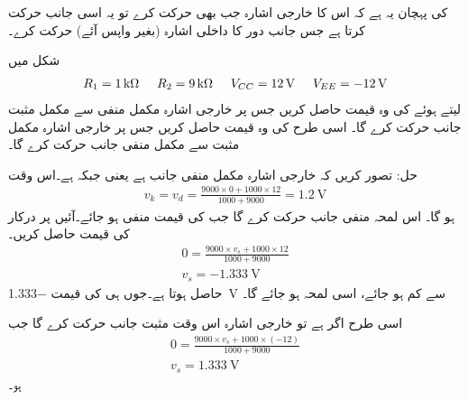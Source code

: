  کی پہچان یہ ہے کہ اس کا خارجی اشارہ جب بھی حرکت کرے تو یہ اسی جانب حرکت کرتا ہے جس جانب دور کا داخلی اشارہ (بغیر واپس آئے) حرکت کرے۔

شکل  میں 
\begin{align*}
R_1=\SI{1}{\kilo \ohm} \hspace{5mm} R_2=\SI{9}{\kilo \ohm} \hspace{5mm} V_{CC}=\SI{12}{\volt} \hspace{5mm} V_{EE}=\SI{-12}{\volt}
\end{align*}
لیتے ہوئے  کی وہ قیمت حاصل کریں جس پر خارجی اشارہ مکمل منفی  سے مکمل مثبت جانب حرکت کرے گا۔ اسی طرح  کی وہ قیمت حاصل کریں جس پر خارجی اشارہ مکمل مثبت  سے مکمل منفی جانب حرکت کرے گا۔

حل:
تصور کریں کہ خارجی اشارہ مکمل منفی جانب ہے یعنی  جبکہ  ہے۔اس وقت
\begin{align*}
v_k=v_d=\frac{9000 \times 0+1000 \times  12}{1000+9000}=\SI{1.2}{\volt}
\end{align*}
ہو گا۔ اس لمحہ منفی جانب حرکت کرے گا جب  کی قیمت منفی ہو جائے۔آئیں  پر درکار  کی قیمت حاصل کریں۔
\begin{align*}
0=\frac{9000 \times v_s+1000 \times  12}{1000+9000}\\
v_s=\SI{-1.333}{\volt}
\end{align*}
حاصل ہوتا ہے۔جوں ہی  کی قیمت \SI{-1.333}{\volt} سے کم ہو جائے، اسی لمحہ  ہو جائے گا۔

اسی طرح اگر  ہے  تو خارجی اشارہ اس وقت مثبت جانب حرکت کرے گا جب
\begin{align*}
0=\frac{9000 \times v_s+1000 \times  \left(-12\right)}{1000+9000}\\
v_s=\SI{1.333}{\volt}
\end{align*}
 ہو۔

